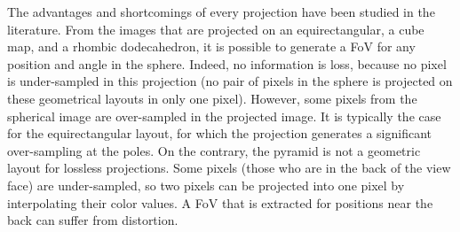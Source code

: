 The advantages and shortcomings of every projection have been studied in the literature. From
the images that are
projected on an equirectangular, a cube map, and a rhombic dodecahedron, it is possible 
to generate a \ac{FoV}
for any position and angle in the sphere. Indeed, no information is loss, because no pixel is under-sampled in 
this projection (no pair of pixels in the sphere is projected on these geometrical 
layouts in only one pixel). However,
some pixels from the spherical image are over-sampled in the projected image. It is typically the case for
the equirectangular layout, for which the projection generates a significant over-sampling at the poles. On the 
contrary, the pyramid is not a geometric layout for lossless projections. Some pixels (those who are in the back
of the view face) are under-sampled, so two pixels can be projected into one pixel by interpolating their color
values. A \ac{FoV} that is extracted for positions near the back can suffer from distortion.